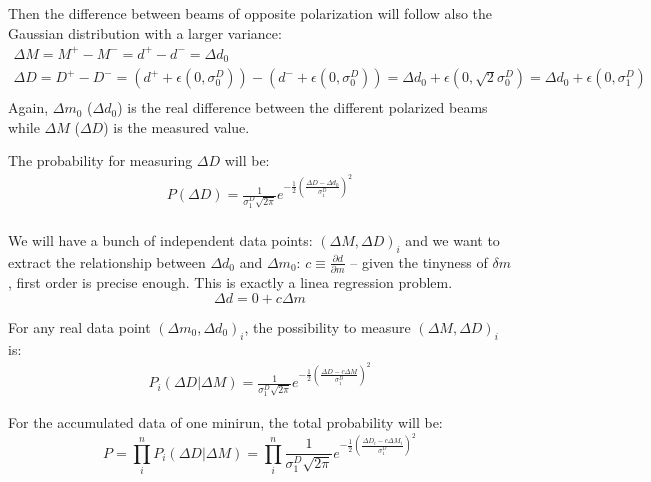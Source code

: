Then the difference between beams of opposite polarization will follow also
the Gaussian distribution with a larger variance:
\begin{equation*}
    \begin{gathered}
	\Delta M = M^+ - M^- = d^+ - d^-    
	    = \Delta d_0    \\
	\Delta D = D^+ - D^- = (d^+ + \epsilon(0, \sigma_0^D)) - (d^- + \epsilon(0, \sigma_0^D))
	    = \Delta d_0 + \epsilon(0, \sqrt{2}\sigma_0^D)
	    = \Delta d_0 + \epsilon(0, \sigma_1^D) \\
    \end{gathered}
\end{equation*}
Again, $\Delta m_0$ ($\Delta d_0$) is the real difference between the
different polarized beams while $\Delta M$ ($\Delta D$) is the measured value.

The probability for measuring $\Delta D$ will be:
\begin{equation*}
    \begin{gathered}
	P(\Delta D) = \frac{1}{\sigma_1^D\sqrt{2\pi}} e^{-\frac{1}{2}\left( \frac{\Delta D - \Delta d_0}{\sigma_1^D}\right)^2}    \\
    \end{gathered}
\end{equation*}

We will have a bunch of independent data points: $(\Delta M, \Delta D)_i$ and 
we want to extract the relationship between $\Delta d_0$ and $\Delta m_0$: 
$c \equiv \frac{\partial d}{\partial m}$ -- given the tinyness of $\delta m$, first
order is precise enough. This is exactly a linea regression problem.
$$ \Delta d = 0 + c \Delta m $$

For any real data point $(\Delta m_0, \Delta d_0)_i$, the possibility to measure
$(\Delta M, \Delta D)_i$ is:
\begin{equation}
    \begin{gathered}
	P_i(\Delta D|\Delta M) = \frac{1}{\sigma_1^D\sqrt{2\pi}} 
	    e^{-\frac{1}{2}\left( \frac{\Delta D - c\Delta M}{\sigma_1^D}\right)^2}
    \end{gathered}
\end{equation}

For the accumulated data of one minirun, the total probability will be:
\begin{equation}
    P = \prod_i^n P_i(\Delta D|\Delta M) = \prod_i^n \frac{1}{\sigma_1^D\sqrt{2\pi}} 
	    e^{-\frac{1}{2}\left( \frac{\Delta D_i - c\Delta M_i}{\sigma_1^D}\right)^2}
\end{equation}

